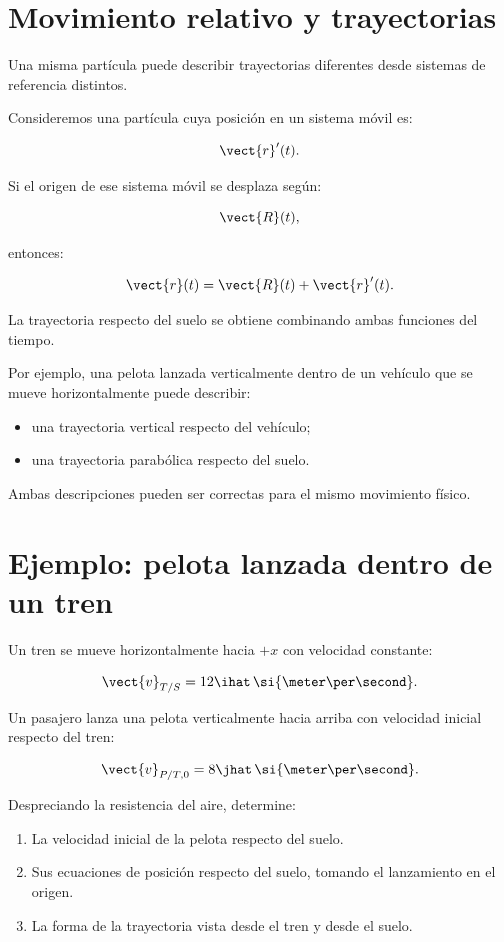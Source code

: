 \section{Movimiento relativo y trayectorias}

Una misma partícula puede describir trayectorias
diferentes desde sistemas de referencia distintos.

Consideremos una partícula cuya posición en un sistema
móvil es:

\[
\vect{r}'(t).
\]

Si el origen de ese sistema móvil se desplaza según:

\[
\vect{R}(t),
\]

entonces:

\[
\vect{r}(t)=\vect{R}(t)+\vect{r}'(t).
\]

La trayectoria respecto del suelo se obtiene
combinando ambas funciones del tiempo.

Por ejemplo, una pelota lanzada verticalmente
dentro de un vehículo que se mueve horizontalmente
puede describir:

\begin{itemize}
    \item una trayectoria vertical respecto del vehículo;
    \item una trayectoria parabólica respecto del suelo.
\end{itemize}

Ambas descripciones pueden ser correctas
para el mismo movimiento físico.


\section{Ejemplo: pelota lanzada dentro de un tren}

\begin{ejemplo}

Un tren se mueve horizontalmente hacia \(+x\)
con velocidad constante:

\[
\vect{v}_{T/S}
=
12\ihat\,
\si{\meter\per\second}.
\]

Un pasajero lanza una pelota verticalmente hacia arriba
con velocidad inicial respecto del tren:

\[
\vect{v}_{P/T,0}
=
8\jhat\,
\si{\meter\per\second}.
\]

Despreciando la resistencia del aire, determine:

\begin{enumerate}[label=\alph*)]
    \item La velocidad inicial de la pelota
    respecto del suelo.
    \item Sus ecuaciones de posición respecto del suelo,
    tomando el lanzamiento en el origen.
    \item La forma de la trayectoria vista desde
    el tren y desde el suelo.
\end{enumerate}

\end{ejemplo}

